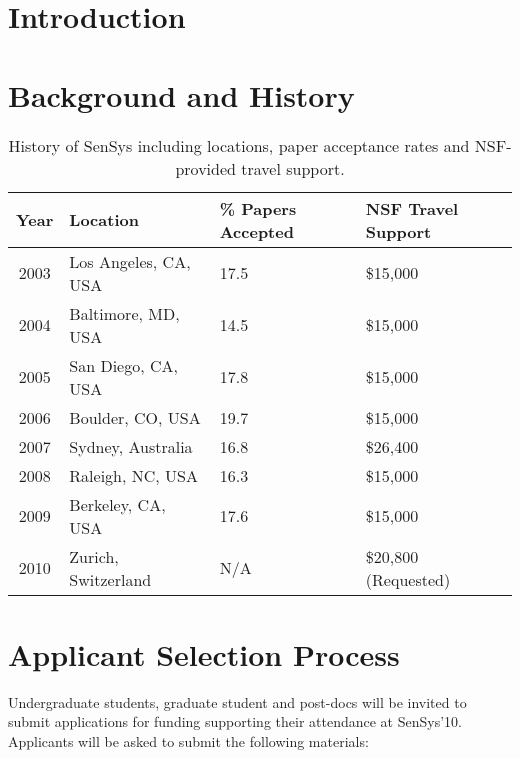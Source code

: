 \section{Introduction}

\section{Background and History}

\begin{table}[t]
\begin{center}
\begin{tabular}{|c|lll|}
\hline
\textbf{Year} & \textbf{Location} & \textbf{\% Papers Accepted} & \textbf{NSF
Travel Support} \\
\hline \hline
2003 & Los Angeles, CA, USA & 17.5 & \$15,000 \\
2004 & Baltimore, MD, USA & 14.5 & \$15,000 \\
2005 & San Diego, CA, USA & 17.8 & \$15,000 \\
2006 & Boulder, CO, USA & 19.7 & \$15,000 \\
2007 & Sydney, Australia & 16.8 & \$26,400 \\
2008 & Raleigh, NC, USA & 16.3 & \$15,000 \\
2009 & Berkeley, CA, USA & 17.6 & \$15,000 \\
2010 & Zurich, Switzerland & N/A & \$20,800 (Requested) \\
\hline
\end{tabular}
\end{center}
\caption{History of SenSys including locations, paper acceptance rates and
NSF-provided travel support.}
\label{table-history}
\end{table}

\section{Applicant Selection Process}

Undergraduate students, graduate student and post-docs will be invited to
submit applications for funding supporting their attendance at SenSys'10.
Applicants will be asked to submit the following materials:

